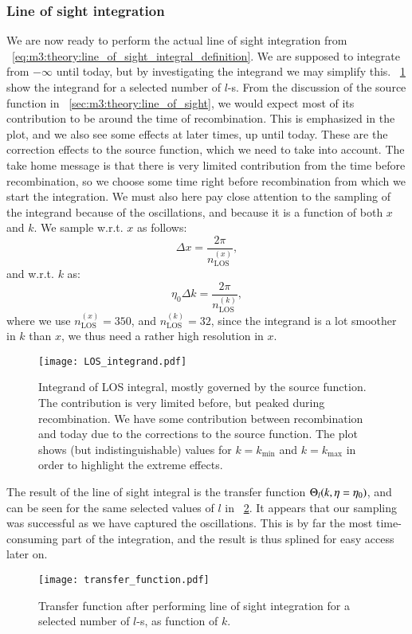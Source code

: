     \subsubsection{Line of sight integration}
        We are now ready to perform the actual line of sight integration from ~\cref{eq:m3:theory:line_of_sight_integral_definition}. We are supposed to integrate from $-\infty$ until today, but by investigating the integrand we may simplify this. ~\cref{fig:m4:LOS_integrand} show the integrand for a selected number of $l$-s. From the discussion of the source function in ~\cref{sec:m3:theory:line_of_sight}, we would expect most of its contribution to be around the time of recombination. This is emphasized in the plot, and we also see some effects at later times, up until today. These are the correction effects to the source function, which we need to take into account. The take home message is that there is very limited contribution from the time before recombination, so we choose some time right before recombination from which we start the integration. We must also here pay close attention to the sampling of the integrand because of the oscillations, and because it is a function of both $x$ and $k$. We sample w.r.t. $x$ as follows:
        \begin{equation}
            \Delta x = \frac{2\pi}{n_\mathrm{LOS}^{(x)}},
        \end{equation}
        and w.r.t. $k$ as:
        \begin{equation}
            \eta_0\Delta k = \frac{2\pi}{n_\mathrm{LOS}^{(k)}},
        \end{equation}
        where we use $n_\mathrm{LOS}^{(x)}=350$, and $n_\mathrm{LOS}^{(k)}=32$, since the integrand is a lot smoother in $k$ than $x$, we thus need a rather high resolution in $x$. 

        \begin{figure}
            \texttt{[image: LOS\_integrand.pdf]}
            \caption{Integrand of LOS integral, mostly governed by the source function. The contribution is very limited before, but peaked during recombination. We have some contribution between recombination and today due to the corrections to the source function. The plot shows (but indistinguishable) values for $k=k_\mathrm{min}$ and $k=k_\mathrm{max}$ in order to highlight the extreme effects.}
            \label{fig:m4:LOS_integrand}
        \end{figure}

        The result of the line of sight integral is the transfer function $\Theta_l(k, \eta=\eta_0)$, and can be seen for the same selected values of $l$ in ~\cref{fig:m4:transfer_function}. It appears that our sampling was successful as we have captured the oscillations. This is by far the most time-consuming part of the integration, and the result is thus splined for easy access later on. 
        \begin{figure}
            \texttt{[image: transfer\_function.pdf]}
            \caption{Transfer function after performing line of sight integration for a selected number of $l$-s, as function of $k$. }
            \label{fig:m4:transfer_function}
        \end{figure}
